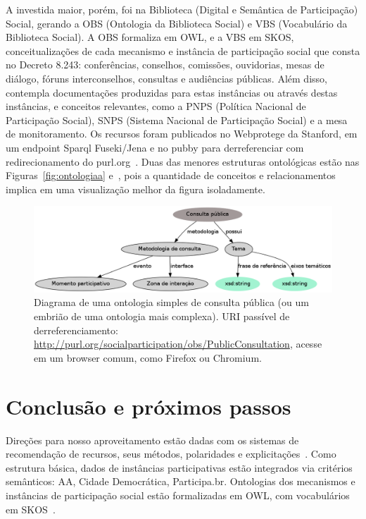 \documentclass[a4paper, 11pt]{article} %
\begin{document}
A investida maior, porém, foi na Biblioteca (Digital e Semântica de Participação) Social, gerando a OBS (Ontologia da Biblioteca Social) e VBS (Vocabulário da Biblioteca Social). A OBS formaliza em OWL, e a VBS em SKOS, conceitualizações de cada mecanismo e instância de participação social que consta no Decreto 8.243: conferências, conselhos, comissões, ouvidorias, mesas de diálogo, fóruns interconselhos, consultas e audiências públicas. Além disso, contempla documentações produzidas para estas instâncias ou através destas instâncias, e conceitos relevantes, como a PNPS (Política Nacional de Participação Social), SNPS (Sistema Nacional de Participação Social) e a mesa de monitoramento. Os recursos foram publicados no Webprotege da Stanford, em um endpoint Sparql Fuseki/Jena e no pubby para derreferenciar com redirecionamento do purl.org~\cite{pnud5}. Duas das menores estruturas ontológicas estão nas Figuras~\ref{fig:ontologiaa} e~\cite{fig:consulta}, pois a quantidade de conceitos e relacionamentos implica em uma visualização melhor da figura isoladamente.
\begin{figure}[h!]
  \centering
    \includegraphics[width=1.\textwidth]{obsConsulta.png}
  \caption{\small Diagrama de uma ontologia simples de consulta pública (ou um embrião de uma ontologia mais complexa). URI passível de derreferenciamento: \url{http://purl.org/socialparticipation/obs/PublicConsultation}, acesse em um browser comum, como Firefox ou Chromium.}\label{fig:consulta}
\end{figure}



\section*{Conclusão e próximos passos}

Direções para nosso aproveitamento estão dadas com os sistemas de recomendação de recursos, seus métodos, polaridades e explicitações~\cite{pnud4}. Como estrutura básica, dados de instâncias participativas estão integrados via critérios semânticos: AA, Cidade Democrática, Participa.br. Ontologias dos mecanismos e instâncias de participação social estão formalizadas em OWL, com vocabulários em SKOS~\cite{pnud5}.
\end{document}
